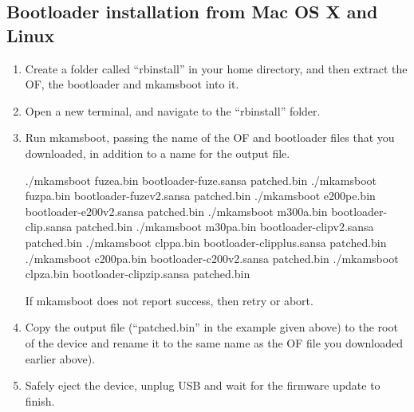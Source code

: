 \subsection{Bootloader installation from Mac OS X and Linux}

\begin{enumerate}

\item Create a folder called ``rbinstall'' in your home directory, and then
  extract the OF, the bootloader and mkamsboot into it.

\item Open a new terminal, and navigate to the ``rbinstall'' folder.

\item Run mkamsboot, passing the name of the OF and bootloader files that
  you downloaded, in addition to a name for the output file.

  \begin{code}[firstline=\opt{fuze}{1}\opt{fuzev2}{2}\opt{e200v2}{3}%
            \opt{clipv1}{4}\opt{clipv2}{5}\opt{clipplus}{6}\opt{c200v2}{7}%
            \opt{clipzip}{8},%
               lastline=\opt{fuze}{1}\opt{fuzev2}{2}\opt{e200v2}{3}%
            \opt{clipv1}{4}\opt{clipv2}{5}\opt{clipplus}{6}\opt{c200v2}{7}%
            \opt{clipzip}{8}]
    ./mkamsboot fuzea.bin bootloader-fuze.sansa patched.bin
    ./mkamsboot fuzpa.bin bootloader-fuzev2.sansa patched.bin
    ./mkamsboot e200pe.bin bootloader-e200v2.sansa patched.bin
    ./mkamsboot m300a.bin bootloader-clip.sansa patched.bin
    ./mkamsboot m30pa.bin bootloader-clipv2.sansa patched.bin
    ./mkamsboot clppa.bin bootloader-clipplus.sansa patched.bin
    ./mkamsboot c200pa.bin bootloader-c200v2.sansa patched.bin
    ./mkamsboot clpza.bin bootloader-clipzip.sansa patched.bin
  \end{code}
 
  If mkamsboot does not report success, then retry or abort.

\item Copy the output file (``patched.bin'' in the example given above) to the
  root of the device and rename it to the same name as the OF file you downloaded earlier 
   
   
   
    above).

\item Safely eject the device, unplug USB and wait for the firmware update to finish.
\end{enumerate}
